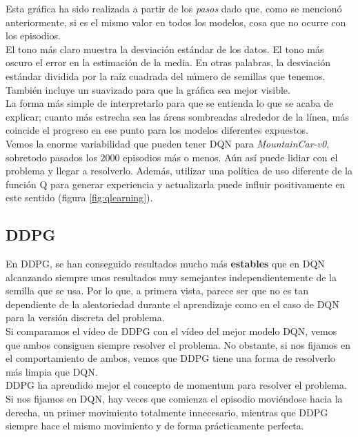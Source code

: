 \documentclass[11pt,fleqn]{book} %
\begin{document}
Esta gráfica ha sido realizada a partir de los \textit{pasos} dado que, como se mencionó anteriormente, si es el mismo valor en todos los modelos, cosa que no ocurre con los episodios. \\

El tono más claro muestra la desviación estándar de los datos. El tono más oscuro el error en la estimación de la media. En otras palabras, la desviación estándar dividida por la raíz cuadrada del número de semillas que tenemos. También incluye un suavizado para que la gráfica sea mejor visible. \\

La forma más simple de interpretarlo para que se entienda lo que se acaba de explicar; cuanto más estrecha sea las áreas sombreadas alrededor de la línea, más coincide el progreso en ese punto para los modelos diferentes expuestos. \\

Vemos la enorme variabilidad que pueden tener DQN para \textit{MountainCar-v0}, sobretodo pasados los 2000 episodios más o menos. Aún así puede lidiar con el problema y llegar a resolverlo. Además, utilizar una política de uso diferente de la función Q para generar experiencia y actualizarla puede influir positivamente en este sentido (figura \ref{fig:qlearning}).

\subsection{DDPG}

En DDPG, se han conseguido resultados mucho más \textbf{estables} que en DQN alcanzando siempre unos resultados muy semejantes independientemente de la semilla que se usa. Por lo que, a primera vista, parece ser que no es tan dependiente de la aleatoriedad durante el aprendizaje como en el caso de DQN para la versión discreta del problema. \\

Si comparamos el vídeo de DDPG con el vídeo del mejor modelo DQN, vemos que ambos consiguen siempre resolver el problema. No obstante, si nos fijamos en el comportamiento de ambos, vemos que DDPG tiene una forma de resolverlo más limpia que DQN. \\

DDPG ha aprendido mejor el concepto de momentum para resolver el problema. Si nos fijamos en DQN, hay veces que comienza el episodio moviéndose hacia la derecha, un primer movimiento totalmente innecesario, mientras que DDPG siempre hace el mismo movimiento y de forma prácticamente perfecta.\\
\end{document}
